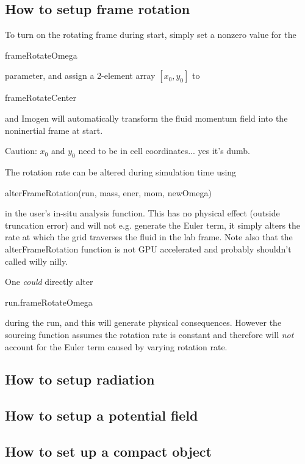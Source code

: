 \documentclass[letterpaper,12pt,twocolumn]{article}
\begin{document}
\subsection{How to setup frame rotation}

To turn on the rotating frame during start, simply set a nonzero value for the \begin{tt}frameRotateOmega\end{tt}
parameter, and assign a 2-element array $\left[x_0, y_0\right]$ to \begin{tt}frameRotateCenter\end{tt}
and Imogen will automatically transform the fluid momentum field into the noninertial frame at start.

Caution: $x_0$ and $y_0$ need to be in cell coordinates... yes it's dumb.

The rotation rate can be altered during simulation time using 
\begin{tt}
alterFrameRotation(run, mass,\newline
ener, mom, newOmega)
\end{tt}
in the user's in-situ analysis function. This has no physical effect (outside truncation error)
and will not e.g. generate the Euler term, it simply alters the rate at which the grid traverses
the fluid in the lab frame. Note also that the alterFrameRotation function is not GPU accelerated
and probably shouldn't called willy nilly.

One \textit{could} directly alter \begin{tt}run.frameRotateOmega\end{tt} during the run,
and this will generate physical consequences. However the sourcing function assumes the
rotation rate is constant and therefore will \textit{not} account for the Euler term caused
by varying rotation rate.

\subsection{How to setup radiation}

\subsection{How to setup a potential field}

\subsection{How to set up a compact object}
\end{document}

